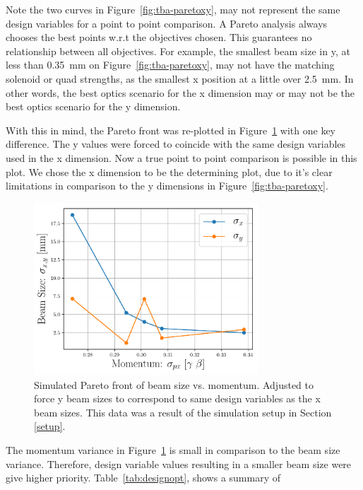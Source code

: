 \fi
Note the two curves in Figure~\ref{fig:tba-paretoxy}, may not represent the same 
design variables for a point to point comparison. A Pareto analysis always 
chooses the best points w.r.t the objectives chosen. This guarantees no 
relationship between all objectives. 
For example, the smallest beam size in y, at less than \SI{0.35}{mm} on Figure~\ref{fig:tba-paretoxy}, 
may not have the matching solenoid or quad strengths, as the smallest x position 
at a little over \SI{2.5}{mm}. In other words, the best optics scenario for the x dimension
may or may not be the best optics scenario for the y dimension. 

With this in mind, the Pareto front was re-plotted in Figure~\ref{fig:tba-paretoxonly} 
with one key difference. The y values were forced to coincide with the same 
design variables used in the x dimension. 
Now a true point to point comparison is possible in this plot.
We chose the x dimension to be the determining plot, 
due to it's clear limitations in comparison to the y dimensions in Figure~\ref{fig:tba-paretoxy}. 
\iftrue
\begin{figure}
	\centering
	\includegraphics[width=0.75\textwidth]{./images/xonly_pareto_front_quads_before_Q5}
	\caption{Simulated Pareto front of beam size vs. momentum.
		Adjusted to force y beam sizes to correspond to same design variables 
		as the x beam sizes.
		This data was a result of the simulation setup in Section \ref{setup}.}
	\label{fig:tba-paretoxonly}
\end{figure}
\fi
The momentum variance in Figure~\ref{fig:tba-paretoxonly} is small in comparison to 
the beam size variance. Therefore, design variable values resulting in a smaller 
beam size were give higher priority. Table~\ref{tab:designopt}, shows a summary of 
